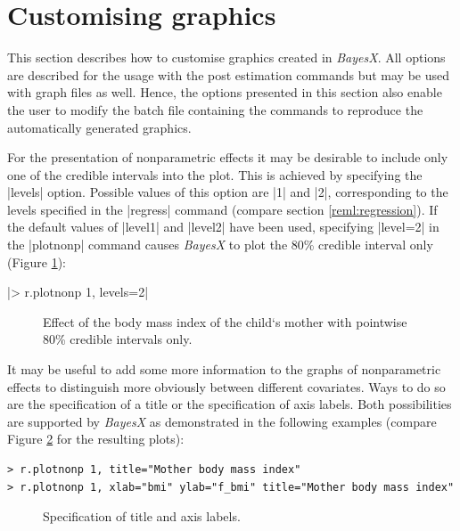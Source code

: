 \section{Customising graphics}\label{reml:custom}

This section describes how to customise graphics created in {\it BayesX}. All options are described for the usage with the post
estimation commands but may be used with graph files as well. Hence, the options presented in this section also enable the user
to modify the batch file containing the commands to reproduce the automatically generated graphics.

For the presentation of nonparametric effects it may be desirable to include only one of the credible intervals into the plot.
This is achieved by specifying the |levels| option. Possible values of this option are |1| and |2|, corresponding to the levels
specified in the |regress| command (compare section \ref{reml:regression}). If the default values of |level1| and |level2| have
been used, specifying |level=2| in the |plotnonp| command causes {\it BayesX} to plot the 80\% credible interval only (Figure
\ref{reml:bmi3}):

|> r.plotnonp 1, levels=2|

\begin{figure}[ht]
\begin{center}
 {\it\caption{Effect of
the body mass index of the child`s mother with pointwise 80\%
credible intervals only.\label{reml:bmi3}}}
\end{center}
\end{figure}

It may be useful to add some more information to the graphs of nonparametric effects to distinguish more obviously between
different covariates. Ways to do so are the specification of a title or the specification of axis labels. Both possibilities
are supported by {\it BayesX} as demonstrated in the following examples (compare Figure \ref{reml:bmi4} for the resulting
plots):

\begin{verbatim}
> r.plotnonp 1, title="Mother body mass index"
> r.plotnonp 1, xlab="bmi" ylab="f_bmi" title="Mother body mass index"
\end{verbatim}

\begin{figure}[ht]
\begin{center}
\begin{multicols}{2}
\end{multicols}
{\it\caption{Specification of title and axis labels.\label{reml:bmi4}}}
\end{center}
\end{figure}

